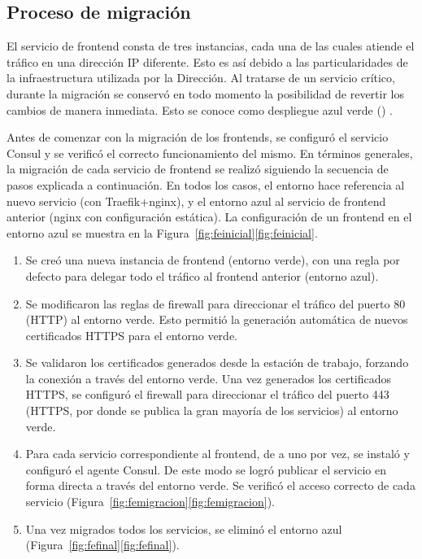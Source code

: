 \subsection{Proceso de migración}

El servicio de frontend consta de tres instancias, cada una de las
cuales atiende el tráfico en una dirección IP diferente. Esto es así
debido a las particularidades de la infraestructura utilizada por la
Dirección. Al tratarse de un servicio crítico, durante la migración se
conservó en todo momento la posibilidad de revertir los cambios de
manera inmediata. Esto se conoce como despliegue azul verde
() \cite{bluegreen}.

Antes de comenzar con la migración de los frontends, se configuró el
servicio Consul y se verificó el correcto funcionamiento del mismo. En
términos generales, la migración de cada servicio de frontend se
realizó siguiendo la secuencia de pasos explicada a continuación. En
todos los casos, el entorno  hace referencia al nuevo
servicio (con Traefik+nginx), y el entorno azul al servicio de
frontend anterior (nginx con configuración estática). La configuración
de un frontend en el entorno azul se muestra en la
\iflatexml{}Figura~\ref{fig:feinicial}\else\autoref{fig:feinicial}\fi.

\begin{enumerate}
\item Se creó una nueva instancia de frontend (entorno verde), con una
  regla por defecto para delegar todo el tráfico al frontend anterior
  (entorno azul).
\item Se modificaron las reglas de firewall para direccionar el
  tráfico del puerto 80 (HTTP) al entorno verde. Esto permitió la
  generación automática de nuevos certificados HTTPS para el entorno
  verde.
\item Se validaron los certificados generados desde la estación de
  trabajo, forzando la conexión a través del entorno verde. Una vez
  generados los certificados HTTPS, se configuró el firewall para
  direccionar el tráfico del puerto 443 (HTTPS, por donde se publica
  la gran mayoría de los servicios) al entorno verde.
\item Para cada servicio correspondiente al frontend, de a uno por
  vez, se instaló y configuró el agente Consul. De este modo se logró
  publicar el servicio en forma directa a través del entorno verde. Se
  verificó el acceso correcto de cada servicio
  (\iflatexml{}Figura~\ref{fig:femigracion}\else\autoref{fig:femigracion}\fi).
\item Una vez migrados todos los servicios, se eliminó el entorno azul
  (\iflatexml{}Figura~\ref{fig:fefinal}\else\autoref{fig:fefinal}\fi).
\end{enumerate}
